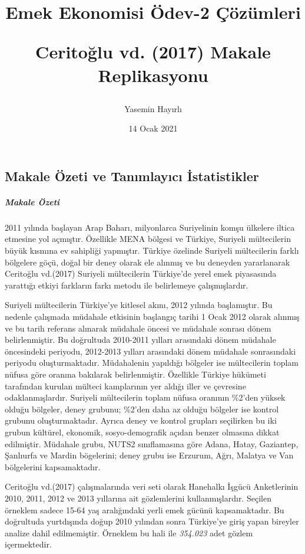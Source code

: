 \documentclass{article}
\begin{document}
    \title{\textbf{Emek Ekonomisi Ödev-2 Çözümleri} \par 
     Ceritoğlu vd. (2017) Makale Replikasyonu}
    \author{Yasemin Hayırlı}
    \date{14 Ocak 2021}
    \maketitle

\subsection*{Makale Özeti ve Tanımlayıcı İstatistikler}
\setlength{\parindent}{0em}
\setlength{\parskip}{0.3em}

    \subparagraph{Makale Özeti} 
    \begin{justify}
    \setlength{\parindent}{0em}
        2011 yılında başlayan Arap Baharı, milyonlarca Suriyelinin komşu ülkelere 
        iltica etmesine yol açmıştır. Özellikle MENA bölgesi ve Türkiye, Suriyeli 
        mültecilerin büyük kısmına ev sahipliği yapmıştır. Türkiye özelinde Suriyeli 
        mültecilerin farklı bölgelere göçü, doğal bir deney olarak ele alınmış ve bu 
        deneyden yararlanarak Ceritoğlu vd.(2017) Suriyeli mültecilerin Türkiye'de 
        yerel emek piyasasında yarattığı etkiyi farkların farkı metodu ile
        belirlemeye çalışmışlardır. 

        Suriyeli mültecilerin Türkiye'ye kitlesel akını, 2012 yılında başlamıştır.
        Bu nedenle çalışmada müdahale etkisinin başlangıç tarihi 1 Ocak 2012 olarak
        alınmış ve bu tarih referans alınarak müdahale öncesi ve müdahale sonrası
        dönem belirlenmiştir. Bu doğrultuda 2010-2011 yılları arasındaki dönem müdahale 
        öncesindeki periyodu, 2012-2013 yılları arasındaki dönem müdahale sonrasındaki 
        periyodu oluşturmaktadır. Müdahalenin yapıldığı bölgeler ise mültecilerin toplam
        nüfusa göre oranına bakılarak belirlenmiştir. Özellikle Türkiye hükümeti tarafından
        kurulan mülteci kamplarının yer aldığı iller ve çevresine odaklanmışlardır.
        Suriyeli mültecilerin toplam nüfusa oranının \%2'den yüksek olduğu bölgeler, 
        deney grubunu; \%2'den daha az olduğu bölgeler ise kontrol grubunu oluşturmaktadır. 
        Ayrıca deney ve kontrol grupları seçilirken bu iki grubun kültürel, ekonomik,
        sosyo-demografik açıdan benzer olmasına dikkat edilmiştir. Müdahale grubu, NUTS2
        sınıflamasına göre Adana, Hatay, Gaziantep, Şanlıurfa ve Mardin bögelerini;
        deney grubu ise Erzurum, Ağrı, Malatya ve Van bölgelerini kapsamaktadır.

        Ceritoğlu vd.(2017) çalışmalarında veri seti olarak Hanehalkı İşgücü Anketlerinin
        2010, 2011, 2012 ve 2013 yıllarına ait gözlemlerini kullanmışlardır. Seçilen örneklem
        sadece 15-64 yaş aralığındaki yerli emek gücünü kapsamaktadır. Bu doğrultuda 
        yurtdışında doğup 2010 yılından sonra Türkiye'ye giriş yapan bireyler analize dahil edilmemiştir.
        Örneklem bu hali ile \textit{354.023} adet gözlem içermektedir.
    \end{justify}
\end{document}
